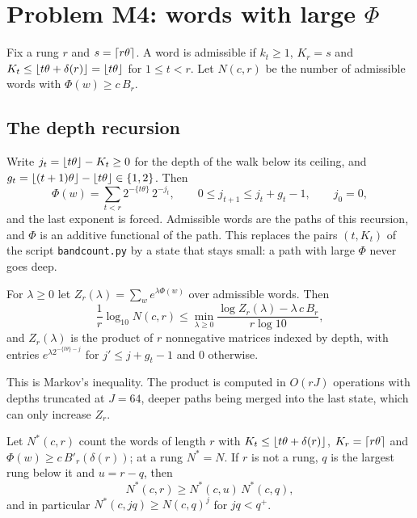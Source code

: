 \section{Problem M4: words with large \texorpdfstring{$\Phi$}{Phi}}\label{rrt:sec:m4}

Fix a rung $r$ and $s=\lceil r\theta\rceil$. A word is admissible if $k_t\ge1$, $K_r=s$ and $K_t\le\lfloor t\theta+\delta(r)\rfloor=\lfloor t\theta\rfloor$ for $1\le t<r$. Let $N(c,r)$ be the number of admissible words with $\Phi(w)\ge c\,B_r$.

\subsection{The depth recursion}
Write $j_t=\lfloor t\theta\rfloor-K_t\ge 0$ for the depth of the walk below its ceiling, and $g_t=\lfloor (t+1)\theta\rfloor-\lfloor t\theta\rfloor\in\{1,2\}$. Then
\[
\Phi(w)=\sum_{t<r}2^{-\{t\theta\}}\,2^{-j_t},\qquad 0\le j_{t+1}\le j_t+g_t-1,\qquad j_0=0,
\]
and the last exponent is forced. Admissible words are the paths of this recursion, and $\Phi$ is an additive functional of the path. This replaces the pairs $(t,K_t)$ of the script \texttt{bandcount.py} by a state that stays small: a path with large $\Phi$ never goes deep.

\begin{proposition}\label{rrt:prop:chernoff}
For $\lambda\ge0$ let $Z_r(\lambda)=\sum_w e^{\lambda\Phi(w)}$ over admissible words. Then
\[
\frac1r\log_{10}N(c,r)\le\min_{\lambda\ge0}\frac{\log Z_r(\lambda)-\lambda\,c\,B_r}{r\log 10},
\]
and $Z_r(\lambda)$ is the product of $r$ nonnegative matrices indexed by depth, with entries $e^{\lambda2^{-\{t\theta\}-j}}$ for $j'\le j+g_t-1$ and $0$ otherwise.
\end{proposition}

This is Markov's inequality. The product is computed in $O(rJ)$ operations with depths truncated at $J=64$, deeper paths being merged into the last state, which can only increase $Z_r$.

\begin{proposition}[Supermultiplicativity]\label{rrt:prop:super}
Let $N^*(c,r)$ count the words of length $r$ with $K_t\le\lfloor t\theta+\delta(r)\rfloor$, $K_r=\lceil r\theta\rceil$ and $\Phi(w)\ge c\,B'_r(\delta(r))$; at a rung $N^*=N$. If $r$ is not a rung, $q$ is the largest rung below it and $u=r-q$, then
\[
N^*(c,r)\ge N^*(c,u)\,N^*(c,q),
\]
and in particular $N^*(c,jq)\ge N(c,q)^j$ for $jq<q^+$.
\end{proposition}

